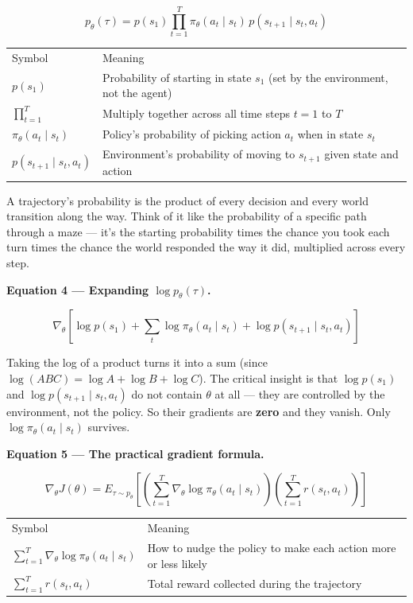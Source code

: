 \[
  p_\theta(\tau)
  = p(s_1)\prod_{t=1}^{T}\pi_\theta(a_t\mid s_t)\,p(s_{t+1}\mid s_t,a_t)
\]

\begin{tabular}{ll}
  Symbol & Meaning \\[4pt]
  $p(s_1)$ & Probability of starting in state $s_1$ (set by the environment, not the agent) \\
  $\prod_{t=1}^T$ & Multiply together across all time steps $t=1$ to $T$ \\
  $\pi_\theta(a_t\mid s_t)$ & Policy's probability of picking action $a_t$ when in state $s_t$ \\
  $p(s_{t+1}\mid s_t,a_t)$ & Environment's probability of moving to $s_{t+1}$ given state and action \\
\end{tabular}

\medskip
A trajectory's probability is the product of every decision and every world transition along
the way. Think of it like the probability of a specific path through a maze --- it's the
starting probability times the chance you took each turn times the chance the world responded
the way it did, multiplied across every step.

\medskip
\textbf{Equation 4 --- Expanding $\log p_\theta(\tau)$.}

\[
  \nabla_\theta\!\left[
    \log p(s_1)
    + \sum_t \log\pi_\theta(a_t\mid s_t)
    + \log p(s_{t+1}\mid s_t,a_t)
  \right]
\]

Taking the log of a product turns it into a sum (since $\log(ABC)=\log A+\log B+\log C$).
The critical insight is that $\log p(s_1)$ and $\log p(s_{t+1}\mid s_t,a_t)$ do not contain
$\theta$ at all --- they are controlled by the environment, not the policy. So their gradients
are \textbf{zero} and they vanish. Only $\log\pi_\theta(a_t\mid s_t)$ survives.

\medskip
\textbf{Equation 5 --- The practical gradient formula.}

\[
  \nabla_\theta J(\theta)
  = E_{\tau\sim p_\theta}\!\left[
      \left(\sum_{t=1}^T \nabla_\theta\log\pi_\theta(a_t\mid s_t)\right)
      \left(\sum_{t=1}^T r(s_t,a_t)\right)
    \right]
\]

\begin{tabular}{ll}
  Symbol & Meaning \\[4pt]
  $\sum_{t=1}^T\nabla_\theta\log\pi_\theta(a_t\mid s_t)$ & How to nudge the policy to make each action more or less likely \\
  $\sum_{t=1}^T r(s_t,a_t)$ & Total reward collected during the trajectory \\
\end{tabular}

